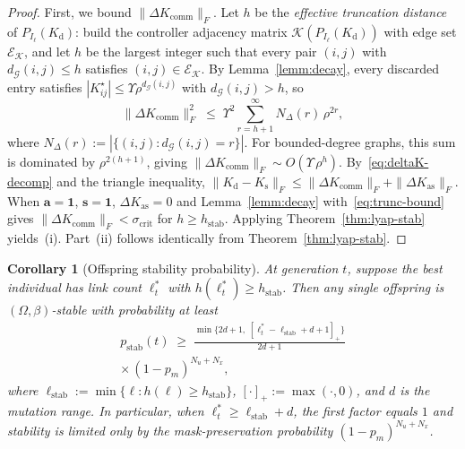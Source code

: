\documentclass[letterpaper, 10pt, conference]{ieeeconf}
\newtheorem{corollary}{Corollary}
\begin{document}
\begin{proof}
First, we bound $\|\Delta K_{\mathrm{comm}}\|_F$. Let $h$ be the \emph{effective
truncation distance} of $P_{I_\ell}(K_{\mathrm{d}})$: build the controller
adjacency matrix $\mathcal{K}(P_{I_\ell}(K_{\mathrm{d}}))$ with edge set
$\mathcal{E}_\mathcal{K}$, and let $h$ be the largest integer such that every pair
$(i,j)$ with $d_{\mathcal{G}}(i,j)\leq h$ satisfies $(i,j)\in\mathcal{E}_\mathcal{K}$.
By Lemma~\ref{lemm:decay}, every discarded
entry satisfies
$|K^{\star}_{ij}|
  \leq \Upsilon\rho^{d_{\mathcal{G}}(i,j)}$
with $d_{\mathcal{G}}(i,j)>h$, so
\begin{equation}\label{eq:trunc-bound}
  \|\Delta K_{\mathrm{comm}}\|_F^2
  \;\leq\;
  \Upsilon^2
  \!\sum_{r=h+1}^{\infty}
    N_{\Delta}(r)\,\rho^{2r},
\end{equation}
where
$N_{\Delta}(r)
  :=|\{(i,j):d_{\mathcal{G}}(i,j)=r\}|$.
For bounded-degree graphs, this sum is
dominated by $\rho^{2(h+1)}$, giving
$\|\Delta K_{\mathrm{comm}}\|_F
  \sim O(\Upsilon\,\rho^{h})$.
By~\eqref{eq:deltaK-decomp} and the
triangle inequality,
$\|K_{\mathrm{d}}-K_{\mathrm{s}}\|_F
  \leq \|\Delta K_{\mathrm{comm}}\|_F
  + \|\Delta K_{\mathrm{as}}\|_F$.
When $\mathbf{a}=\mathbf{1}$,
$\mathbf{s}=\mathbf{1}$,
$\Delta K_{\mathrm{as}}=0$ and
Lemma~\ref{lemm:decay}
with~\eqref{eq:trunc-bound} gives
$\|\Delta K_{\mathrm{comm}}\|_F
  < \sigma_{\mathrm{crit}}$
for $h\geq h_{\mathrm{stab}}$.
Applying Theorem~\ref{thm:lyap-stab}
yields~(i).
Part~(ii) follows identically from
Theorem~\ref{thm:lyap-stab}.
\end{proof}
\begin{corollary}[Offspring stability probability]
\label{cor:ea-stab}
At generation $t$, suppose the best
individual has link count $\ell_t^*$
with $h(\ell_t^*)\geq h_{\mathrm{stab}}$.
Then any single offspring is
$(\Omega,\beta)$-stable with
probability at least
\begin{equation}\label{eq:p_stab}
\begin{aligned}
  p_{\mathrm{stab}}(t) \;\geq\;
  \frac{\min\bigl\{2d\!+\!1,\;[\ell_t^*\!-\!\ell_{\mathrm{stab}}\!+\!d\!+\!1]_+\bigr\}}{2d+1}\\
  \times\,(1\!-\!p_m)^{N_u+N_x},
\end{aligned}
\end{equation}
where $\ell_{\mathrm{stab}}
  := \min\{\ell:h(\ell)
  \geq h_{\mathrm{stab}}\}$,
$[\cdot]_+:=\max(\cdot,0)$,
and $d$ is the mutation range.
In particular, when
$\ell_t^*\geq\ell_{\mathrm{stab}}+d$,
the first factor equals $1$ and
stability is limited only by the
mask-preservation probability
$(1-p_m)^{N_u+N_x}$.
\end{corollary}
\end{document}
